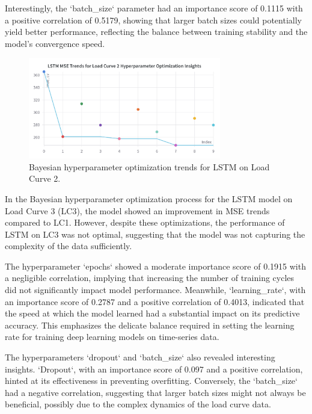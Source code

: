 \documentclass{article} %
\begin{document}
Interestingly, the `batch\_size` parameter had an importance score of 0.1115 with a positive correlation of 0.5179, showing that larger batch sizes could potentially yield better performance, reflecting the balance between training stability and the model's convergence speed.


\begin{figure}[H]
    \centering
    \includegraphics[width=0.75\textwidth]{ressources/Hyperparams/LSTM/LSTM MSE Trends for Load Curve 2 Hyperparameter Optimization Insights.png}
    \caption{Bayesian hyperparameter optimization trends for LSTM on Load Curve 2.}
    \label{fig:lstm_lc2}
\end{figure}
In the Bayesian hyperparameter optimization process for the \gls*{LSTM} model on Load Curve 3 (\gls*{LC3}), the model showed an improvement in \gls*{MSE} trends compared to \gls*{LC1}. However, despite these optimizations, the performance of \gls*{LSTM} on \gls*{LC3} was not optimal, suggesting that the model was not capturing the complexity of the data sufficiently.

The hyperparameter `epochs` showed a moderate importance score of 0.1915 with a negligible correlation, implying that increasing the number of training cycles did not significantly impact model performance. Meanwhile, `learning\_rate`, with an importance score of 0.2787 and a positive correlation of 0.4013, indicated that the speed at which the model learned had a substantial impact on its predictive accuracy. This emphasizes the delicate balance required in setting the learning rate for training deep learning models on time-series data.

The hyperparameters `dropout` and `batch\_size` also revealed interesting insights. `Dropout`, with an importance score of 0.097 and a positive correlation, hinted at its effectiveness in preventing overfitting. Conversely, the `batch\_size` had a negative correlation, suggesting that larger batch sizes might not always be beneficial, possibly due to the complex dynamics of the load curve data.
\end{document}
